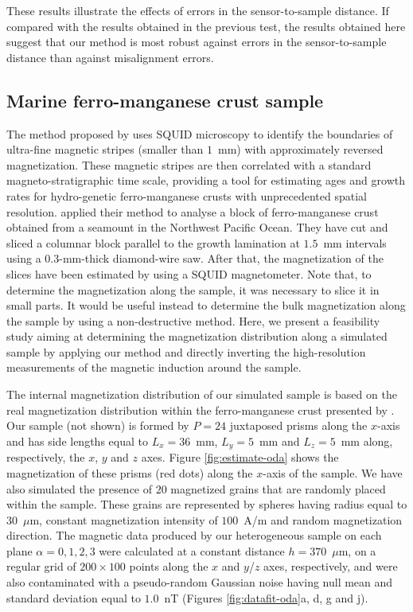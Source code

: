 \documentclass[draft,gc]{agutex}
\begin{document}
\begin{article}
These results illustrate the effects of errors in the sensor-to-sample
distance.
If compared with the results obtained in the previous test, 
the results obtained here suggest that our method is most robust against errors in
the sensor-to-sample distance than against misalignment errors.

\subsection{Marine ferro-manganese crust sample}
\label{subsec:Marine ferro-manganese crust sample}

The method proposed by \citet{oda2011} 
uses SQUID microscopy to identify the boundaries of ultra-fine magnetic stripes 
(smaller than $1$~mm) with approximately reversed magnetization. These magnetic stripes are 
then correlated with a standard magneto-stratigraphic time scale, providing a tool for 
estimating ages and growth rates for hydro-genetic ferro-manganese crusts with unprecedented 
spatial resolution.
\citet{oda2011} applied their method to analyse a block of ferro-manganese crust obtained 
from a seamount in the Northwest Pacific Ocean. They have cut and sliced a columnar block 
parallel to the growth lamination at $1.5$~mm intervals using a $0.3$-mm-thick diamond-wire 
saw. After that, the magnetization of the slices have been estimated by using a 
SQUID magnetometer.
Note that, to determine the magnetization along the sample, it was necessary to slice 
it in small parts. It would be useful instead to determine the bulk magnetization along 
the sample by using a non-destructive method.
Here, we present a feasibility study aiming at  
determining the magnetization distribution along a simulated sample
by applying our method and directly inverting the high-resolution measurements of 
the magnetic induction around the sample. 

The internal magnetization distribution of our simulated sample
is based on the real magnetization distribution within the
ferro-manganese crust presented by \citet{oda2011}.
Our sample (not shown) is formed by $P = 24$ juxtaposed prisms along the 
$x$-axis and has side 
lengths equal to $L_{x} = 36$~mm, $L_{y} = 5$~mm and $L_{z} = 5$~mm along, 
respectively, the $x$, $y$ and $z$ axes.
Figure \ref{fig:estimate-oda} shows the magnetization of these prisms 
(red dots) along the $x$-axis of the sample.
We have also simulated the presence of $20$ magnetized grains that 
are randomly placed within the sample.
These grains are represented by spheres having radius equal to $30$~$\mu$m,
constant magnetization intensity of $100$~A/m and random magnetization direction.
The magnetic data produced by our heterogeneous sample on 
each plane $\alpha = 0, 1, 2, 3$ were calculated at a
constant distance $h = 370$~$\mu$m, on
a regular grid of $200 \times 100$ points along the $x$ and 
$y$/$z$ axes, respectively, and were also contaminated with a 
pseudo-random Gaussian noise having null mean and standard 
deviation equal to $1.0$~nT (Figures \ref{fig:datafit-oda}a,
d, g and j).


\end{article}
\end{document}
